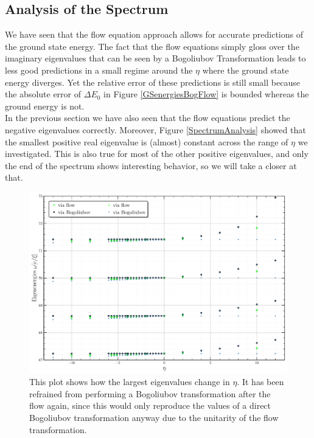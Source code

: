 \subsection{Analysis of the Spectrum}
We have seen that the flow equation approach allows for accurate predictions of the ground state energy. The fact that the flow equations simply gloss over the imaginary eigenvalues that can be seen by a Bogoliubov Transformation leads to less good predictions in a small regime around the $\eta$ where the ground state energy diverges. Yet the relative error of these predictions is still small because the absolute error of $\Delta E_0$ in Figure \ref{GSenergiesBogFlow} is bounded whereas the ground energy is not.\\
In the previous section we have also seen that the flow equations predict the negative eigenvalues correctly. Moreover,  Figure \ref{SpectrumAnalysis} showed that the smallest positive real eigenvalue is (almost) constant across the range of $\eta$ we investigated. This is also true for most of the other positive eigenvalues, and only the end of the spectrum shows interesting behavior, so we will take a closer at that.
\begin{figure}[H]
    \centering
    \includegraphics[width=\textwidth]{figures/plots/PDF/SpectralAnalysis.pdf}
    \caption[End of the spectrum of the Hamiltonian for different $\eta$]{This plot shows how the largest eigenvalues change in $\eta$. It has been refrained from performing a Bogoliubov transformation after the flow again, since this would only reproduce the values of a direct Bogoliubov transformation anyway due to the unitarity of the flow transformation.
}
    \label{EndOfSpectrumAnalysis}
\end{figure}
